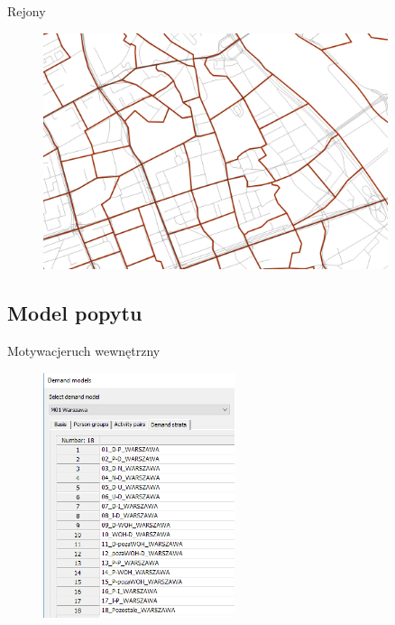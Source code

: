 \documentclass[8pt]{beamer}
\begin{document}
\begin{frame}{Rejony}
\begin{figure}\begin{center}
\includegraphics[width=0.9\textwidth]{zones3}
 \end{center}  \end{figure} 
\end{frame}

\subsection{Model popytu}
\begin{frame}{Motywacje}{ruch wewnętrzny}
\begin{figure}\begin{center}
\includegraphics[width=0.5\textwidth]{strata}
 \end{center}  \end{figure} 
\end{frame}
\end{document}
